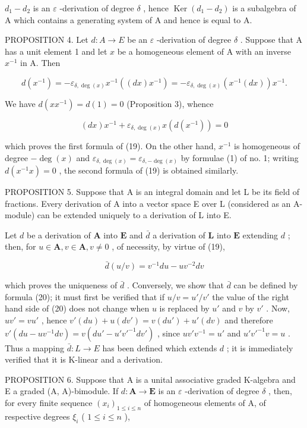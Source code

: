 \(d_{1} - d_{2}\) is an \(\varepsilon\) -derivation of degree \(\delta\) , hence \(\operatorname{Ker}(d_1 - d_2)\) is a subalgebra of A which contains a generating system of A and hence is equal to A.

PROPOSITION 4. Let \(d:A\to E\) be an \(\varepsilon\) -derivation of degree \(\delta\) . Suppose that A has a unit element 1 and let \(x\) be a homogeneous element of A with an inverse \(x^{-1}\) in A. Then

\[
d (x ^ {- 1}) = - \varepsilon_ {\delta , \deg (x)} x ^ {- 1} ((d x) x ^ {- 1}) = - \varepsilon_ {\delta , \deg (x)} (x ^ {- 1} (d x)) x ^ {- 1}.\tag{19}
\]

We have \(d(xx^{-1}) = d(1) = 0\) (Proposition 3), whence

\[
(d x) x ^ {- 1} + \varepsilon_ {\delta , \deg (x)} x (d (x ^ {- 1})) = 0
\]

which proves the first formula of (19). On the other hand, \(x^{-1}\) is homogeneous of degree \(-\deg(x)\) and \(\varepsilon_{\delta,\deg(x)} = \varepsilon_{\delta,-\deg(x)}\) by formulae (1) of no. 1; writing \(d(x^{-1}x) = 0\) , the second formula of (19) is obtained similarly.

PROPOSITION 5. Suppose that A is an integral domain and let L be its field of fractions. Every derivation of A into a vector space E over L (considered as an A-module) can be extended uniquely to a derivation of L into E.

Let \(d\) be a derivation of \(\mathbf{A}\) into \(\mathbf{E}\) and \(\bar{d}\) a derivation of \(\mathbf{L}\) into \(\mathbf{E}\) extending \(d\) ; then, for \(u \in \mathbf{A}, v \in \mathbf{A}, v \neq 0\) , of necessity, by virtue of (19),

\[
\bar {d} (u / v) = v ^ {- 1} d u - u v ^ {- 2} d v\tag{20}
\]

which proves the uniqueness of \(\bar{d}\) . Conversely, we show that \(\bar{d}\) can be defined by formula (20); it must first be verified that if \(u / v = u' / v'\) the value of the right hand side of (20) does not change when \(u\) is replaced by \(u'\) and \(v\) by \(v'\) . Now, \(uv' = vu'\) , hence \(v'(du) + u(dv') = v(du') + u'(dv)\) and therefore \(v'(du - uv^{-1}dv) = v(du' - u'v'^{-1}dv')\) , since \(uv'v^{-1} = u'\) and \(u'v'^{-1}v = u\) . Thus a mapping \(\bar{d}: L \to E\) has been defined which extends \(d\) ; it is immediately verified that it is K-linear and a derivation.

PROPOSITION 6. Suppose that A is a unital associative graded K-algebra and E a graded (A, A)-bimodule. If \(d: \mathbf{A} \to \mathbf{E}\) is an \(\varepsilon\) -derivation of degree \(\delta\) , then, for every finite sequence \((x_i)_{1 \leqslant i \leqslant n}\) of homogeneous elements of A, of respective degrees \(\xi_i\) ( \(1 \leqslant i \leqslant n\) ),

